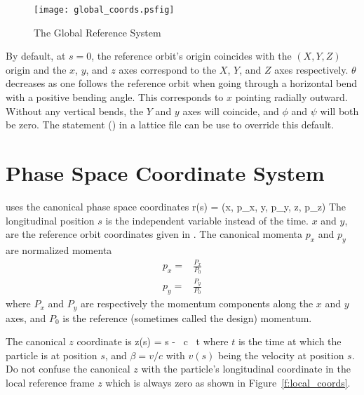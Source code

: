 \begin{figure}
\centering
\texttt{[image: global\_coords.psfig]}
\caption{The Global Reference System}
\label{f:global_coords}
\end{figure}

By default, at $s = 0$, the reference orbit's origin coincides with
the $(X, Y, Z)$ origin and the $x$, $y$, and $z$ axes correspond to
the $X$, $Y$, and $Z$ axes respectively. $\theta$ decreases as one
follows the reference orbit when going through a horizontal bend with
a positive bending angle. This corresponds to $x$ pointing radially
outward. Without any vertical bends, the $Y$ and $y$ axes will
coincide, and $\phi$ and $\psi$ will both be zero. The 
statement () in a lattice file can be use to override
this default.

\vfill

\section{Phase Space Coordinate System}
\label{s:phase_space_coords}

\bmad uses the canonical phase space coordinates 
\Begineq
  \Bf r(s) = (x, p_x, y, p_y, z, p_z)
\Endeq
The longitudinal position $s$ is the independent variable instead of
the time.  $x$ and $y$, are the reference orbit coordinates given in
.  The canonical momenta $p_x$ and $p_y$ are
normalized momenta
\begin{align}
  p_x = &\frac{P_x}{P_0} \\
  p_y = &\frac{P_y}{P_0}
\end{align}
where $P_x$ and $P_y$ are respectively the momentum components along
the $x$ and $y$ axes, and $P_0$ is the reference (sometimes called the
design) momentum.

The canonical $z$ coordinate is 
\Begineq
  z(s) = s - \beta \, c \, t 
  \label{zsbct}
\Endeq
where $t$ is the time at which the particle is at
position $s$, and $\beta = v/c$ with $v(s)$ being the velocity at position $s$. 
Do not confuse the canonical $z$ with the particle's longitudinal coordinate
in the local reference frame $z$ which is always zero as shown in
Figure~\ref{f:local_coords}.

